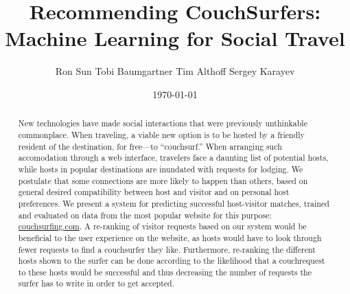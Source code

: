 \documentclass{article}
\title{Recommending CouchSurfers: Machine Learning for Social Travel}
\author{Ron Sun \And Tobi Baumgartner \And Tim Althoff \And Sergey Karayev}
\date{\today}
\begin{document}
\maketitle

\begin{abstract}
New technologies have made social interactions that were previously unthinkable commonplace.
When traveling, a viable new option is to be hosted by a friendly resident of the destination, for free---to ``couchsurf.''
When arranging such accomodation through a web interface, travelers face a daunting list of potential hosts, while hosts in popular destinations are inundated with requests for lodging.
We postulate that some connections are more likely to happen than others, based on general desired compatibility between host and visitor and on personal host preferences.
We present a system for predicting successful host-visitor matches, trained and evaluated on data from the most popular website for this purpose: \url{couchsurfing.com}.
A re-ranking of visitor requests based on our system would be beneficial to the user experience on the website, as hosts would have to look through fewer requests to find a couchsurfer they like.
Furthermore, re-ranking the different hosts shown to the surfer can be done according to the likelihood that a couchrequest to these hosts would be successful and thus decreasing the number of requests the surfer has to write in order to get accepted.
\end{abstract}










\small

\end{document}
